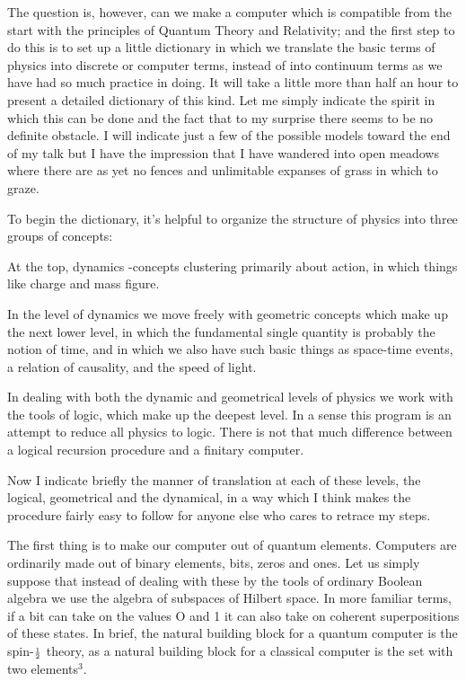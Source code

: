 The question is, however, can we make a computer which is compatible from the
start with the principles of Quantum Theory and Relativity; and the first step to
do this is to set up a little dictionary in which we translate the basic terms of
physics into discrete or computer terms, instead of into continuum terms as we
have had so much practice in doing. It will take a little more than half an hour
to present a detailed dictionary of this kind. Let me simply indicate the spirit
in which this can be done and the fact that to my surprise there seems to be no
definite obstacle. I will indicate just a few of the possible models toward the
end of my talk but I have the impression that I have wandered into open meadows
where there are as yet no fences and unlimitable expanses of grass in which to
graze.

To begin the dictionary, it's helpful to organize the structure of physics into
three groups of concepts:

At the top, dynamics -concepts clustering primarily about action, in which things
like charge and mass figure.

In the level of dynamics we move freely with geometric concepts which make up the
next lower level, in which the fundamental single quantity is probably the notion
of time, and in which we also have such basic things as space-time events, a
relation of causality, and the speed of light.

In dealing with both the dynamic and geometrical levels of physics we work with
the tools of logic, which make up the deepest level. In a sense this program is
an attempt to reduce all physics to logic. There is not that much difference
between a logical recursion procedure and a finitary computer.

Now I indicate briefly the manner of translation at each of these levels, the
logical, geometrical and the dynamical, in a way which I think makes the
procedure fairly easy to follow for anyone else who cares to retrace my steps.

The first thing is to make our computer out of quantum elements. Computers are
ordinarily made out of binary elements, bits, zeros and ones. Let us simply
suppose that instead of dealing with these by the tools of ordinary Boolean
algebra we use the algebra of subspaces of Hilbert space. In more familiar terms,
if a bit can take on the values O and 1 it can also take on coherent
superpositions of these states. In brief, the natural building block for a
quantum computer is the spin-${\scriptstyle{\frac{1}{2}}}$ theory, as a natural building block for a
classical computer is the set with two elements$^3$.

